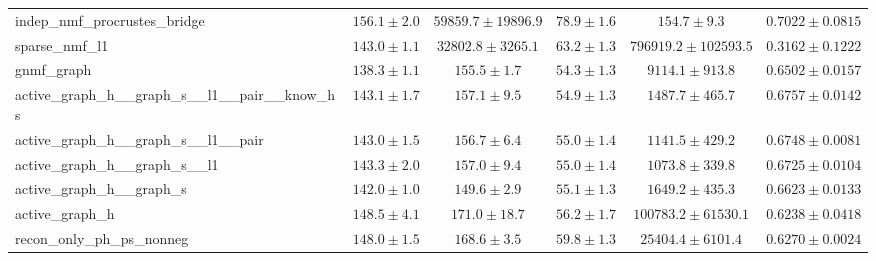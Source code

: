 \begin{table}[htbp]
\begin{subtable}{\textwidth}
\begin{tabular}{lccccc}
indep\_nmf\_procrustes\_bridge & $156.1\pm2.0$ & $59859.7\pm19896.9$ & $78.9\pm1.6$ & $154.7\pm9.3$ & $0.7022\pm0.0815$ \\
sparse\_nmf\_l1 & $143.0\pm1.1$ & $32802.8\pm3265.1$ & $63.2\pm1.3$ & $796919.2\pm102593.5$ & $0.3162\pm0.1222$ \\
gnmf\_graph & $138.3\pm1.1$ & $155.5\pm1.7$ & $54.3\pm1.3$ & $9114.1\pm913.8$ & $0.6502\pm0.0157$ \\
active\_graph\_h\_\_graph\_s\_\_l1\_\_pair\_\_know\_hs & $143.1\pm1.7$ & $157.1\pm9.5$ & $54.9\pm1.3$ & $1487.7\pm465.7$ & $0.6757\pm0.0142$ \\
active\_graph\_h\_\_graph\_s\_\_l1\_\_pair & $143.0\pm1.5$ & $156.7\pm6.4$ & $55.0\pm1.4$ & $1141.5\pm429.2$ & $0.6748\pm0.0081$ \\
active\_graph\_h\_\_graph\_s\_\_l1 & $143.3\pm2.0$ & $157.0\pm9.4$ & $55.0\pm1.4$ & $1073.8\pm339.8$ & $0.6725\pm0.0104$ \\
active\_graph\_h\_\_graph\_s & $142.0\pm1.0$ & $149.6\pm2.9$ & $55.1\pm1.3$ & $1649.2\pm435.3$ & $0.6623\pm0.0133$ \\
active\_graph\_h & $148.5\pm4.1$ & $171.0\pm18.7$ & $56.2\pm1.7$ & $100783.2\pm61530.1$ & $0.6238\pm0.0418$ \\
recon\_only\_ph\_ps\_nonneg & $148.0\pm1.5$ & $168.6\pm3.5$ & $59.8\pm1.3$ & $25404.4\pm6101.4$ & $0.6270\pm0.0024$ \\
\bottomrule
\end{tabular}
\end{subtable}
\end{table}